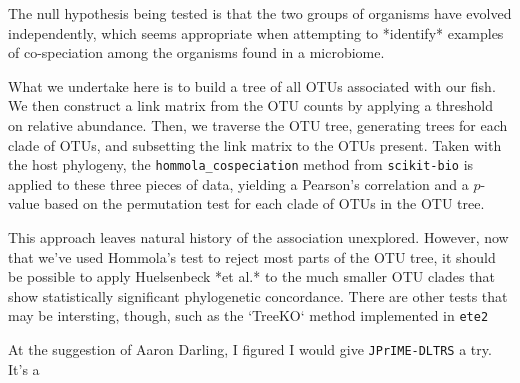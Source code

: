 The null hypothesis being tested is that the two groups of organisms have
evolved independently, which seems appropriate when attempting to *identify*
examples of co-speciation among the organisms found in a microbiome. 

What we undertake here is to build a tree of all OTUs associated with our
fish. We then construct a link matrix from the OTU counts by applying a
threshold on relative abundance. Then, we traverse the OTU tree, generating
trees for each clade of OTUs, and subsetting the link matrix to the OTUs
present. Taken with the host phylogeny, the {\tt hommola\_cospeciation} method 
from {\tt scikit-bio} is applied to these three pieces of data, yielding a 
Pearson's correlation and a $p$-value based on the permutation test for 
each clade of OTUs in the OTU tree.

This approach leaves natural history of the association unexplored. However,
now that we've used Hommola's test to reject most parts of the OTU tree, it
should be possible to apply Huelsenbeck *et al.* to the much smaller OTU 
clades that show statistically significant phylogenetic concordance. There
are other tests that may be intersting, though, such as the `TreeKO` method
implemented in {\tt ete2} %


At the suggestion of Aaron Darling, I figured I would give {\tt JPrIME-DLTRS}
a try. It's a 

